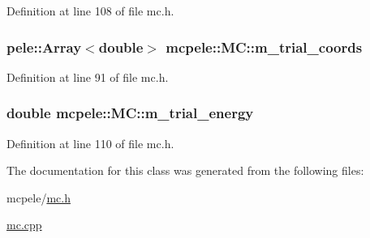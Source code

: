 \-Definition at line 108 of file mc.\-h.

\hypertarget{classmcpele_1_1MC_ab32722238c16272bf95141b825fd3bf4}{
\subsubsection[{m\-\_\-trial\-\_\-coords}]{\setlength{\rightskip}{0pt plus 5cm}pele\-::\-Array$<$double$>$ {\bf mcpele\-::\-M\-C\-::m\-\_\-trial\-\_\-coords}}}\label{classmcpele_1_1MC_ab32722238c16272bf95141b825fd3bf4}


\-Definition at line 91 of file mc.\-h.

\hypertarget{classmcpele_1_1MC_a956f949abbf2bd055e72924cb136f3e7}{
\subsubsection[{m\-\_\-trial\-\_\-energy}]{\setlength{\rightskip}{0pt plus 5cm}double {\bf mcpele\-::\-M\-C\-::m\-\_\-trial\-\_\-energy}}}\label{classmcpele_1_1MC_a956f949abbf2bd055e72924cb136f3e7}


\-Definition at line 110 of file mc.\-h.



\-The documentation for this class was generated from the following files\-:\begin{DoxyCompactItemize}
\item 
mcpele/\hyperlink{mc_8h}{mc.\-h}\item 
\hyperlink{mc_8cpp}{mc.\-cpp}\end{DoxyCompactItemize}

